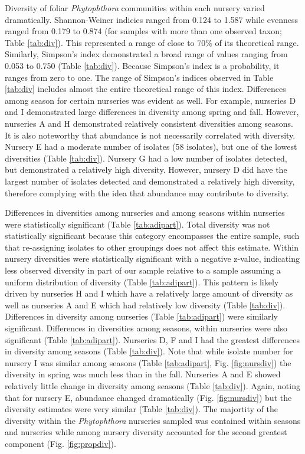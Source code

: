 \documentclass[12pt]{article}
\begin{document}
Diversity of foliar \emph{Phytophthora} communities within each nursery varied dramatically.  Shannon-Weiner indicies ranged from 0.124 to 1.587 while evenness ranged from 0.179 to 0.874 (for samples with more than one observed taxon; Table \ref{tab:div}).  This represented a range of close to 70\% of its theoretical range.  Similarly, Simpson's index demonstrated a broad range of values ranging from 0.053 to 0.750 (Table \ref{tab:div}).  Because Simpson's index is a probability, it ranges from zero to one.  The range of Simpson's indices observed in Table \ref{tab:div} includes almost the entire theoretical range of this index.  Differences among season for certain nurseries was evident as well.  For example, nurseries D and I demonstrated large differences in diversity among spring and fall.  However, nurseries A and H demonstrated relatively consistent diversities among seasons.  It is also noteworthy that abundance is not necessarily correlated with diversity.  Nursery E had a moderate number of isolates (58 isolates), but one of the lowest diversities (Table \ref{tab:div}).  Nursery G had a low number of isolates detected, but demonstrated a relatively high diversity.  However, nursery D did have the largest number of isolates detected and demonstrated a relatively high diversity, therefore complying with the idea that abundance may contribute to diversity.

Differences in diversities among nurseries and among seasons within nurseries were statistically significant (Table \ref{tab:adipart}).  Total diversity was not statistically significant because this category encompasses the entire sample, such that re-assigning isolates to other groupings does not affect this estimate.  Within nursery diversities were statistically significant with a negative z-value, indicating less observed diversity in part of our sample relative to a sample assuming a uniform distribution of diversity (Table \ref{tab:adipart}).  This pattern is likely driven by nurseries H and I which have a relatively large amount of diversity as well as nurseries A and E which had relatively low diversity (Table \ref{tab:div}).  Differences in diversity among nurseries (Table \ref{tab:adipart}) were similarly significant.  Differences in diversities among seasons, within nurseries were also significant (Table \ref{tab:adipart}).  Nurseries D, F and I had the greatest differences in diversity among seasons (Table \ref{tab:div}).  Note that while isolate number for nursery I was similar among seasons (Table \ref{tab:adipart}, Fig. \ref{fig:nursdiv}) the diversity in spring was much less than in the fall.  Nurseries A and E showed relatively little change in diversity among seasons (Table \ref{tab:div}).  Again, noting that for nursery E, abundance changed dramatically (Fig. \ref{fig:nursdiv}) but the diversity estimates were very similar (Table \ref{tab:div}).  The majortity of the diversity within the \emph{Phytophthora} nurseries sampled was contained within seasons and nurseries while among nursery diversity accounted for the second greatest component (Fig. \ref{fig:propdiv}).
\end{document}
